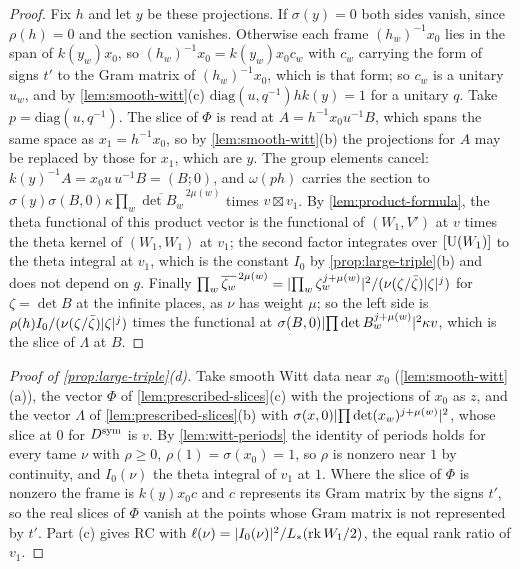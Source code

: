 \begin{proof}
Fix $h$ and let $y$ be these projections. If $\sigma(y)=0$ both sides vanish, since $\rho(h)=0$ and the section vanishes. Otherwise each frame $(h_w)^{-1}x_0$ lies in the span of $k(y_w)x_0$, so
$(h_w)^{-1}x_0=k(y_w)x_0c_w$ with $c_w$ carrying the form of signs $t'$ to the Gram matrix of $(h_w)^{-1}x_0$, which is that form; so $c_w$ is a unitary $u_w$, and by \cref{lem:smooth-witt}(c) $\mathrm{diag}(u,q^{-1})hk(y)=1$
for a unitary $q$. Take $p=\mathrm{diag}(u,q^{-1})$. The slice of $\Phi$ is read at $A=h^{-1}x_0u^{-1}B$, which spans the same space as $x_1=h^{-1}x_0$, so by \cref{lem:smooth-witt}(b) the projections
for $A$ may be replaced by those for $x_1$, which are $y$. The group elements cancel: $k(y)^{-1}A=x_0u\,u^{-1}B=(B;0)$, and $\omega(ph)$ carries the section to $\sigma(y)\sigma(B,0)\kappa\prod_w\overline{\det B_w}^{\,2\mu(w)}$
times $v\boxtimes v_1$. By \cref{lem:product-formula}, the theta functional of this product vector is the functional of $(W_1,V')$ at $v$ times the theta kernel of $(W_1,W_1)$ at $v_1$; the second factor integrates
over $[\operatorname{U}(W_1)]$ to the theta integral at $v_1$, which is the constant $I_0$ by \cref{prop:large-triple}(b) and does not depend on $g$. Finally
$\prod_w\overline{\zeta_w}^{\,2\mu(w)}=\lvert \prod_w\zeta_w^{j+\mu(w)}\rvert^2/(\nu(\zeta/\bar\zeta)\lvert \zeta\rvert^{j})$ for $\zeta=\det B$ at the infinite places, as $\nu$ has weight $\mu$; so the left side is
$\rho(h)I_0/(\nu(\zeta/\bar\zeta)\lvert \zeta\rvert^j)$ times the functional at $\sigma(B,0)\lvert \prod\det B_w^{j+\mu(w)}\rvert^2\kappa v$, which is the slice of $\Lambda$ at $B$.
\end{proof}

\begin{proof}[Proof of \cref{prop:large-triple}(d)]
Take smooth Witt data near $x_0$ (\cref{lem:smooth-witt}(a)), the vector $\Phi$ of \cref{lem:prescribed-slices}(c) with the projections of $x_0$ as $z$, and the vector $\Lambda$ of \cref{lem:prescribed-slices}(b)
with $\sigma(x,0)\lvert \prod\det(x_w)^{j+\mu(w)}\rvert^2$, whose slice at $0$ for $D^{\rm sym}$ is $v$. By \cref{lem:witt-periods} the identity of periods holds for every tame $\nu$ with $\rho\ge0$, $\rho(1)=\sigma(x_0)=1$, so
$\rho$ is nonzero near $1$ by continuity, and $I_0(\nu)$ the theta integral of $v_1$ at $1$. Where the slice of $\Phi$ is nonzero the frame is $k(y)x_0c$ and $c$ represents its Gram matrix by the signs $t'$, so the
real slices of $\Phi$ vanish at the points whose Gram matrix is not represented by $t'$. Part (c) gives $\mathrm{RC}$ with $\ell(\nu)=\lvert I_0(\nu)\rvert^2/L_*(\operatorname{rk}W_1/2)$, the equal rank ratio of $v_1$.
\end{proof}

